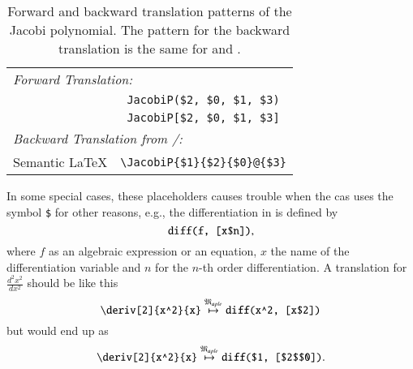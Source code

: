 \begin{table}[ht]
	\centering
	\begin{tabular}{lc}
		\hline
		\multicolumn{2}{l}{\textit{Forward Translation:}} \\
		\Maple & \verb|JacobiP($2, $0, $1, $3)| \\
		\Mathematica & \verb|JacobiP[$2, $0, $1, $3]|\\
		\hline
		\multicolumn{2}{l}{\textit{Backward Translation from \Maple/\Mathematica:}} \\
		Semantic \LaTeX & \verb|\JacobiP{$1}{$2}{$0}@{$3}|\\
		\hline
	\end{tabular}
	\caption{Forward and backward translation patterns of the Jacobi polynomial. The pattern for the backward translation is the same for \Maple{} and \Mathematica.}
	\label{tab:placeholder_ex2}
\end{table}

In some special cases, these placeholders causes trouble when the \gls*{cas} uses the symbol \verb|$| for other reasons, e.g., the differentiation in \Maple{} is defined by
\begin{equation}
\verb|diff(f, [x$n])|,
\end{equation}
where $f$ as an algebraic expression or an equation, $x$ the name of the differentiation variable and $n$ for the $n$-th order differentiation. A translation for $\frac{d^2x^2}{dx^2}$ should be like this
\begin{equation}
\verb|\deriv[2]{x^2}{x}| \overset{\langMaple}{\mapsto} \verb|diff(x^2, [x$2])|
\end{equation}
but would end up as
\begin{equation}
\verb|\deriv[2]{x^2}{x}| \overset{\langMaple}{\mapsto} \verb|diff($1, [$2$$0])|.
\end{equation}



